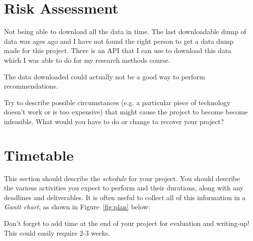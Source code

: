 \documentclass[a4paper,12pt]{article}
\begin{document}
\section*{Risk Assessment}

Not being able to download all the data in time. The last downloadable dump of data was ages ago and I have not found the right person to get a data dump made for this project. There is an API that I can use to download this data which I was able to do for my research methods course.

The data downloaded could actually not be a good way to perform recommendations.



Try to describe possible circumstances (e.g. a particular piece of
technology doesn't work or is too expensive) that might cause
the project to become become infeasible. What would you have to do
or change to recover your project?

\section*{Timetable}

This section should describe the {\em schedule} for your project. 
You should describe the various activities you expect to perform
and their durations, along with any deadlines and deliverables.
It is often useful to collect all of this information in a
{\em Gantt chart}, as shown in Figure~\ref{fig:plan} below:




Don't forget to add time at the end of your project for 
evaluation and writing-up! This could easily require 2-3 weeks.



\end{document}
